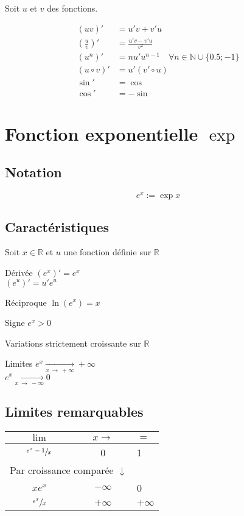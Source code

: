 \documentclass{article}
\newcommand{\R}{\mathds{R}}
\newcommand{\N}{\mathds{N}}
\newcommand{\oo}{\infty}
\newcommand{\twoColsNB}[1]{\multicolumn{2}{c}{#1}}
\newcommand{\goesto}[2]{\xrightarrow[#1\:\to\:#2]{}}
\newenvironment{descriptiona}{\begin{description}[leftmargin=!,labelwidth=\widthof{\bfseries The longest label}]}{\end{description}}
\begin{document}
Soit $u$ et $v$ des fonctions.

\begin{equation*}
    \begin{split}
        (uv)' &= u'v+v'u\\
        \left(\frac{u}{v}\right)' &= \frac{u'v-v'u}{v^2}\\
        (u^n)' &= nu'u^{n-1}\quad\forall n\in\N\cup\{0.5; -1\}\\
        (u \circ v)' &= u'(v' \circ u)\\
        \sin' &= \cos \\
        \cos' &= -\sin
    \end{split}
\end{equation*}

\newpage\section{Fonction exponentielle $\exp$}

\subsection{Notation}

\[e^x := \exp{x}\]

\subsection{Caractéristiques}

Soit $x \in \R$ et $u$ une fonction définie sur $\R$

\begin{descriptiona}
\item[Dérivée] $(e^x)' = e^x$\\$(e^u)' = u'e^u$
\item[Réciproque] $\ln(e^x) = x$
\item[Signe] $e^x > 0$
\item[Variations] strictement croissante sur $\R$
\item[Limites] $e^x \goesto{x}{+\oo} +\oo $\\$ e^x \goesto{x}{-\oo} 0$
\end{descriptiona}

\subsection{Limites remarquables}
\begin{table}[h]
    \centering
    \begin{tabular}{cc|l}
        $\lim$ & $x\to$ & $=$ \\\hline\hline
        $\sfrac{e^x-1}{x}$ & 0 & 1 \\\hline
        \twoColsNB{Par croissance comparée $\downarrow$} & \\\hline
        $xe^x$ & $-\oo$ & 0 \\\hline
        $\sfrac{e^x}{x}$ & $+\oo$ & $+\oo$
    \end{tabular}
\end{table}
\end{document}
